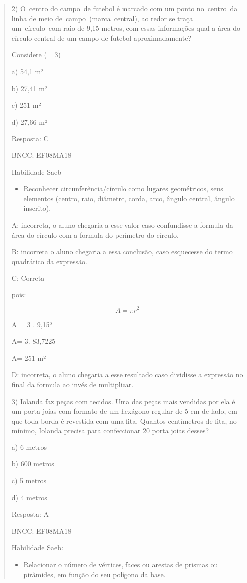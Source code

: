 \begin{quote}
\begin{escolha}
2) O~centro do campo~de futebol é marcado com um ponto no~centro~da
linha de meio de~campo~(marca~central), ao redor se traça um~círculo~com
raio de 9,15 metros, com essas informações qual a área do círculo
central de um campo de futebol aproximadamente?

Considere (\pi = 3)

a) 54,1 m²

b) 27,41 m²

c) 251 m²

d) 27,66 m²

Resposta: C

BNCC: EF08MA18

Habilidade Saeb

\begin{itemize}
\tightlist
\item
  Reconhecer circunferência/círculo como lugares geométricos, seus
  elementos (centro, raio, diâmetro, corda, arco, ângulo central, ângulo
  inscrito).
\end{itemize}

A: incorreta, o aluno chegaria a esse valor caso confundisse a formula
da área do círculo com a formula do perímetro do círculo.

B: incorreta o aluno chegaria a essa conclusão, caso esquecesse do termo
quadrático da expressão.

C: Correta

pois:

\[A = \pi r^{2}\]

A = 3 . 9,15²

A= 3. 83,7225

A= 251 m²

D: incorreta, o aluno chegaria a esse resultado caso dividisse a
expressão no final da formula ao invés de multiplicar.

3) Iolanda faz peças com tecidos. Uma das peças mais vendidas por ela é
um porta joias com formato de um hexágono regular de 5 cm de lado, em
que toda borda é revestida com uma fita. Quantos centímetros de fita, no
mínimo, Iolanda precisa para confeccionar 20 porta joias desses?

a) 6 metros

b) 600 metros

c) 5 metros

d) 4 metros

Resposta: A

BNCC: EF08MA18

Habilidade Saeb:

\begin{itemize}
\tightlist
\item
  Relacionar o número de vértices, faces ou arestas de prismas ou
  pirâmides, em função do seu polígono da base.
\end{itemize}


\end{escolha}
\end{quote}
